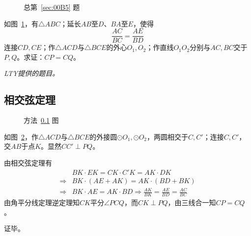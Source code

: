 

\begin{figure}[htbp]
  \centering {}
  \caption{总第~\ref{sec:00B5} 题} \label{fig:00B5}
\end{figure}

如图~\ref{fig:00B5}，有$\triangle ABC$；延长$AB$至$D$、$BA$至$E$，使得
\[ \frac{AC}{BC} = \frac{AE}{BD} \]
连接$CD, CE$；作$\triangle ACD$与$\triangle BCE$的外心$O_1, O_2$；作直线$O_1O_2$分别与$AC, BC$交于$P, Q$。求证：$CP = CQ$。

\emph{LTY提供的题目。}

\subsection{相交弦定理} \label{subsec:00B5-cc}

\begin{figure}[htbp]
  \centering {}
  \caption{方法~\ref{subsec:00B5-cc} 图} \label{fig:00B5-cc}
\end{figure}

如图~\ref{fig:00B5-cc}，作$\triangle ACD$与$\triangle BCE$的外接圆$\odot O_1, \odot O_2$，两圆相交于$C, C'$；连接$C, C'$，交$AB$于点$K$。显然$CC' \perp PQ$。

由相交弦定理有
\begin{align*}
  & BK\cdot EK = CK\cdot C'K = AK \cdot DK \\
  \Rightarrow{}& BK\cdot(AE + AK) = AK\cdot(BD + BK) \\
  \Rightarrow{}& BK\cdot AE = AK\cdot BD \Rightarrow \frac{AK}{BK} = \frac{AE}{BD} = \frac{AC}{BC}
\end{align*}
由角平分线定理逆定理知$CK$平分$\angle PCQ$，而$CK \perp PQ$，由三线合一知$CP = CQ$。

证毕。

